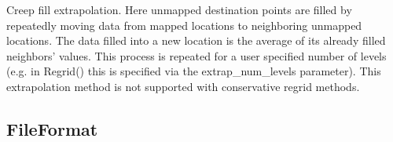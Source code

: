 \documentclass[letterpaper,10pt,english]{sphinxmanual}
\begin{document}
\begin{fulllineitems}
\begin{fulllineitems}
\end{fulllineitems}


\begin{fulllineitems}
\label{\detokenize{ExtrapMethod:ESMF.api.constants.ExtrapMethod.CREEP_FILL}}
Creep fill extrapolation.
Here unmapped destination points are filled by repeatedly moving data from
mapped locations to neighboring unmapped locations. The data filled into a 
new location is the average of its already filled neighbors’ values. This 
process is repeated for a user specified number of levels (e.g. in Regrid() 
this is specified via the extrap\_num\_levels parameter). This extrapolation 
method is not supported with conservative regrid methods.

\end{fulllineitems}


\end{fulllineitems}



\subsection{FileFormat}
\label{\detokenize{FileFormat:fileformat}}\label{\detokenize{FileFormat::doc}}
\end{document}
